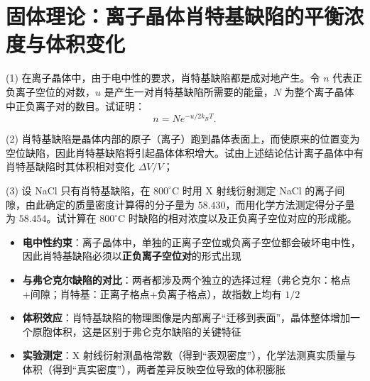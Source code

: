 \section{固体理论：离子晶体肖特基缺陷的平衡浓度与体积变化}
\label{sec:schottky-defect}

\begin{modelbox}[题目：离子晶体肖特基缺陷的统计热力学]
(1) 在离子晶体中，由于电中性的要求，肖特基缺陷都是成对地产生。令 $n$ 代表正负离子空位的对数，$u$ 是产生一对肖特基缺陷所需要的能量，$N$ 为整个离子晶体中正负离子对的数目。试证明：
\begin{equation}
n = N e^{-u/2k_{\!B}T}.
\end{equation}

(2) 肖特基缺陷是晶体内部的原子（离子）跑到晶体表面上，而使原来的位置变为空位缺陷，因此肖特基缺陷将引起晶体体积增大。试由上述结论估计离子晶体中有肖特基缺陷时其体积相对变化 $\Delta V/V$；

(3) 设 NaCl 只有肖特基缺陷，在 $800^{\circ}\mathrm{C}$ 时用 X 射线衍射测定 NaCl 的离子间隙，由此确定的质量密度计算得的分子量为 $58.430$，而用化学方法测定得分子量为 $58.454$。试计算在 $800^{\circ}\mathrm{C}$ 时缺陷的相对浓度以及正负离子空位对应的形成能。
\end{modelbox}

\begin{tipbox}[考点快速分析]
\begin{itemize}
    \item \textbf{电中性约束}：离子晶体中，单独的正离子空位或负离子空位都会破坏电中性，因此肖特基缺陷必须以\textbf{正负离子空位对}的形式出现
    \item \textbf{与弗仑克尔缺陷的对比}：两者都涉及两个独立的选择过程（弗仑克尔：格点+间隙；肖特基：正离子格点+负离子格点），故指数上均有 $1/2$
    \item \textbf{体积效应}：肖特基缺陷的物理图像是内部离子``迁移到表面''，晶体整体增加一个原胞体积，这是区别于弗仑克尔缺陷的关键特征
    \item \textbf{实验测定}：X 射线衍射测晶格常数（得到``表观密度''），化学法测真实质量与体积（得到``真实密度''），两者差异反映空位导致的体积膨胀
\end{itemize}
\end{tipbox}

